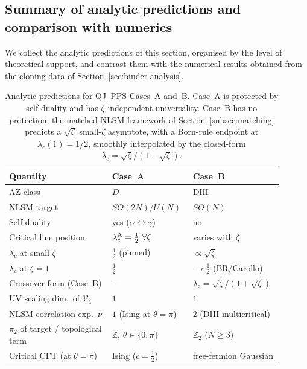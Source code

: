 \subsection{Summary of analytic predictions and comparison with
            numerics}
\label{subsec:predictions-summary}

We collect the analytic predictions of this section, organised by the
level of theoretical support, and contrast them with the numerical
results obtained from the cloning data of
Section~\ref{sec:binder-analysis}.

\begin{table}[h]
\centering
\renewcommand{\arraystretch}{1.3}
\begin{tabular}{p{0.36\linewidth}p{0.27\linewidth}p{0.27\linewidth}}
\toprule
\textbf{Quantity} & \textbf{Case~A} & \textbf{Case~B}\\
\midrule
AZ class & $D$ & $\mathrm{DIII}$\\
NLSM target & $SO(2N)/U(N)$ & $SO(N)$\\
Self-duality & yes ($\alpha\leftrightarrow\gamma$) & no\\
Critical line position & $\lambda_c^{\rm A}=\tfrac12\ \forall\zeta$ & varies with $\zeta$\\
$\lambda_c$ at small $\zeta$ & $\tfrac12$ (pinned) & $\propto\sqrt{\zeta}$\\
$\lambda_c$ at $\zeta=1$ & $\tfrac12$ & $\to\tfrac12$ (BR/Carollo)\\
Crossover form (Case~B) & --- & $\lambda_c=\sqrt{\zeta}/(1+\sqrt{\zeta})$\\
UV scaling dim.\ of $\mathcal V_\zeta$ & $1$ & $1$\\
NLSM correlation exp.\ $\nu$ & $1$ (Ising at $\theta=\pi$) & $2$ (DIII multicritical)\\
$\pi_2$ of target / topological term & $\mathbb Z$, $\theta\in\{0,\pi\}$
                                     & $\mathbb Z_2$ ($N\geq 3$)\\
Critical CFT (at $\theta=\pi$) & Ising ($c=\tfrac12$) & free-fermion Gaussian\\
\bottomrule
\end{tabular}
\caption{Analytic predictions for QJ--PPS Cases~A and~B.  Case~A is
protected by self-duality and has $\zeta$-independent universality.
Case~B has no protection; the matched-NLSM framework of
Section~\ref{subsec:matching} predicts a $\sqrt{\zeta}$ small-$\zeta$
asymptote, with a Born-rule endpoint at $\lambda_c(1)=1/2$, smoothly
interpolated by the closed-form $\lambda_c=\sqrt{\zeta}/(1+\sqrt{\zeta})$.}
\label{tab:caseAB-summary}
\end{table}


